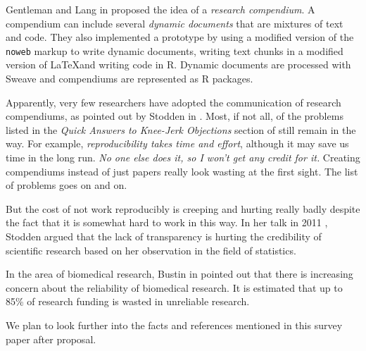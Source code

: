 Gentleman and Lang in \cite{gentleman2007statistical} proposed the idea of a \emph{research compendium}. A compendium can include several \emph{dynamic documents} that are mixtures of text and code. They also implemented a prototype by using a modified version of the \texttt{noweb} markup \cite{ramsey1994literate} to write dynamic documents, writing text chunks in a modified version of \LaTeX and writing code in R. Dynamic documents are processed with Sweave \cite{leisch2002sweave} and compendiums are represented as R packages.

Apparently, very few researchers have adopted the communication of research compendiums, as pointed out by Stodden in \cite{stodden2014enabling}. Most, if not all, of the problems listed in the \emph{Quick Answers to Knee-Jerk Objections} section of \cite{donoho2009reproducible} still remain in the way. For example, \emph{reproducibility takes time and effort}, although it may save us time in the long run. \emph{No one else does it, so I won't get any credit for it.} Creating compendiums instead of just papers really look wasting at the first sight. The list of problems goes on and on.

But the cost of not work reproducibly is creeping and hurting really badly despite the fact that it is somewhat hard to work in this way. In her talk in 2011 \cite{stodden2011establishing}, Stodden argued that the lack of transparency is hurting the credibility of scientific research based on her observation in the field of statistics.

In the area of biomedical research, Bustin in \cite{bustin2015reproducibility} pointed out that there is increasing concern about the reliability of biomedical research. It is estimated that up to 85\% of research funding is wasted in unreliable research.

We plan to look further into the facts and references mentioned in this survey paper after proposal.

